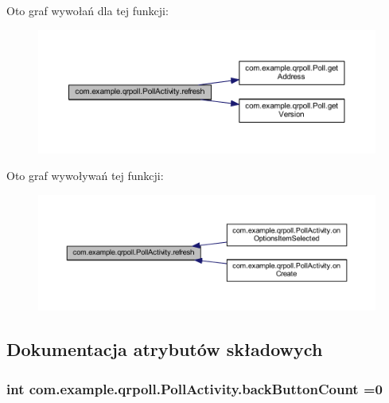 Oto graf wywołań dla tej funkcji\+:
\nopagebreak
\begin{figure}[H]
\begin{center}
\leavevmode
\includegraphics[width=350pt]{classcom_1_1example_1_1qrpoll_1_1_poll_activity_a6c59d6b3beb1d5fea9899b0b0cb51e1f_cgraph}
\end{center}
\end{figure}




Oto graf wywoływań tej funkcji\+:
\nopagebreak
\begin{figure}[H]
\begin{center}
\leavevmode
\includegraphics[width=350pt]{classcom_1_1example_1_1qrpoll_1_1_poll_activity_a6c59d6b3beb1d5fea9899b0b0cb51e1f_icgraph}
\end{center}
\end{figure}




\subsection{Dokumentacja atrybutów składowych}
\hypertarget{classcom_1_1example_1_1qrpoll_1_1_poll_activity_a0cb80128cd6ae3abb14437dbcf82f876}{
\subsubsection[{back\+Button\+Count}]{\setlength{\rightskip}{0pt plus 5cm}int com.\+example.\+qrpoll.\+Poll\+Activity.\+back\+Button\+Count =0\hspace{0.3cm}{\ttfamily [private]}}}\label{classcom_1_1example_1_1qrpoll_1_1_poll_activity_a0cb80128cd6ae3abb14437dbcf82f876}


